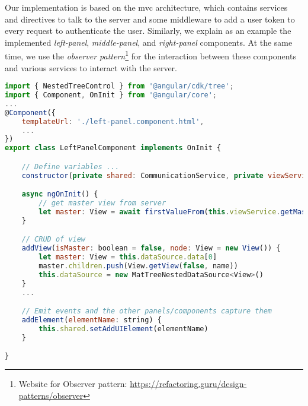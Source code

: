 Our implementation is based on the \ac{mvc} architecture, which contains services and directives to talk to the server and some middleware to add a user token to every request to authenticate the user.
Similarly, we explain as an example the implemented \textit{left-panel}, \textit{middle-panel}, and \textit{right-panel} components. 
At the same time, we use the \textit{observer pattern}\footnote{Website for Observer pattern: \url{https://refactoring.guru/design-patterns/observer}} for the interaction between these components and various services to interact with the server.

\begin{lstlisting}[language=JavaScript, caption=The Typescript File for the Left Panel, label=listing:implementation:left]
import { NestedTreeControl } from '@angular/cdk/tree';
import { Component, OnInit } from '@angular/core';
...
@Component({
    templateUrl: './left-panel.component.html',
    ...
})
export class LeftPanelComponent implements OnInit {

    // Define variables ...
    constructor(private shared: CommunicationService, private viewService: ViewsService, ...) { }

    async ngOnInit() {
        // get master view from server
        let master: View = await firstValueFrom(this.viewService.getMasterView())
    }

    // CRUD of view
    addView(isMaster: boolean = false, node: View = new View()) {
        let master: View = this.dataSource.data[0]
        master.children.push(View.getView(false, name))
        this.dataSource = new MatTreeNestedDataSource<View>()
    }
    ...

    // Emit events and the other panels/components capture them
    addElement(elementName: string) {
        this.shared.setAddUIElement(elementName)
    }

}    
\end{lstlisting}
